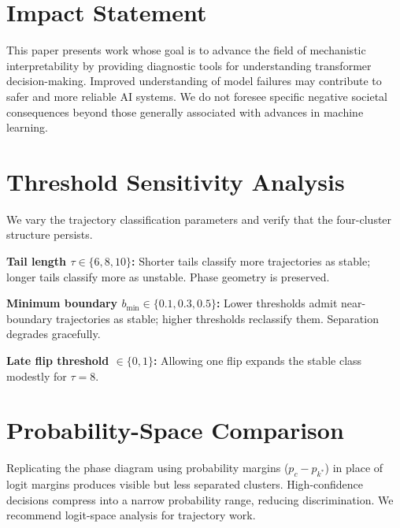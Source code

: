 \documentclass{article}
\begin{document}
\FloatBarrier

\section*{Impact Statement}

This paper presents work whose goal is to advance the field of mechanistic interpretability by providing diagnostic tools for understanding transformer decision-making.  Improved understanding of model failures may contribute to safer and more reliable AI systems.  We do not foresee specific negative societal consequences beyond those generally associated with advances in machine learning.






\newpage
\appendix
\onecolumn

\section{Threshold Sensitivity Analysis}
\label{sec:appendix_sensitivity}

We vary the trajectory classification parameters and verify that the four-cluster structure persists.

\textbf{Tail length $\tau \in \{6, 8, 10\}$:}  Shorter tails classify more trajectories as stable; longer tails classify more as unstable.  Phase geometry is preserved.

\textbf{Minimum boundary $b_{\min} \in \{0.1, 0.3, 0.5\}$:}  Lower thresholds admit near-boundary trajectories as stable; higher thresholds reclassify them.  Separation degrades gracefully.

\textbf{Late flip threshold $\in \{0, 1\}$:}  Allowing one flip expands the stable class modestly for $\tau = 8$.

\section{Probability-Space Comparison}
\label{sec:appendix_prob}

Replicating the phase diagram using probability margins ($p_c - p_{k^*}$) in place of logit margins produces visible but less separated clusters.  High-confidence decisions compress into a narrow probability range, reducing discrimination.  We recommend logit-space analysis for trajectory work.
\end{document}

